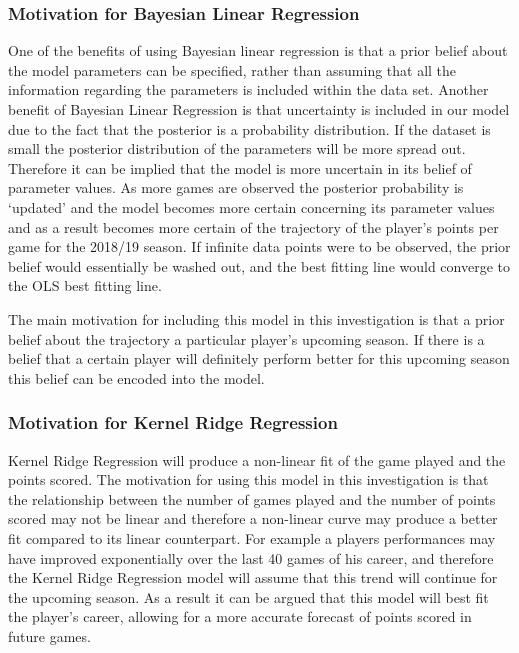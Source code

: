 \documentclass[a4paper,11pt,twoside]{article}
\begin{document}
\subsubsection{Motivation for Bayesian Linear Regression}
One of the benefits of using Bayesian linear regression is that a prior belief about the model parameters can be specified, rather than assuming that all the information regarding the parameters is included within the data set. Another benefit of Bayesian Linear Regression is that uncertainty is included in our model due to the fact that the posterior is a probability distribution. If the dataset is small the posterior distribution of the parameters will be more spread out. Therefore it can be implied that the model is more uncertain in its belief of parameter values. As more games are observed the posterior probability is `updated' and the model becomes more certain concerning its parameter values and as a result becomes more certain of the trajectory of the player's points per game for the 2018/19 season. If infinite data points were to be observed, the prior belief would essentially be washed out, and the best fitting line would converge to the OLS best fitting line.

The main motivation for including this model in this investigation is that a prior belief about the trajectory a particular player's upcoming season. If there is a belief that a certain player will definitely perform better for this upcoming season this belief can be encoded into the model.

\subsubsection{Motivation for Kernel Ridge Regression}

Kernel Ridge Regression will produce a non-linear fit of the game played and the points scored. The motivation for using this model in this investigation is that the relationship between the number of games played and the number of points scored may not be linear and therefore a non-linear curve may produce a better fit compared to its linear counterpart. For example a players performances may have improved exponentially over the last 40 games of his career, and therefore the Kernel Ridge Regression model will assume that this trend will continue for the upcoming season. As a result it can be argued that this model will best fit the player's career, allowing for a more accurate forecast of points scored in future games.
\end{document}
